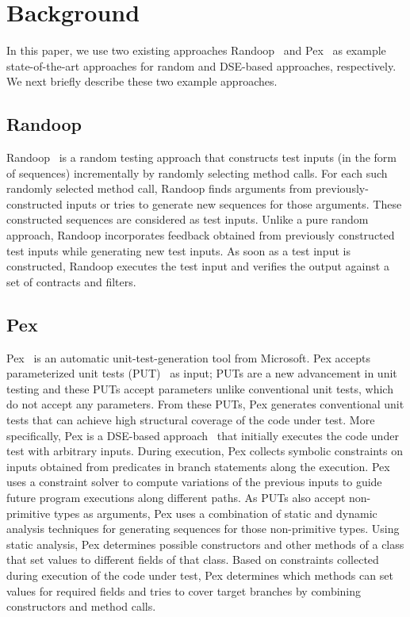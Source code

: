 \section{Background}
\label{sec:background}

In this paper, we use two existing approaches Randoop~\cite{pacheco:feedback} and Pex~\cite{tillman:pexwhite} as example state-of-the-art approaches for random and DSE-based approaches, respectively. We next briefly describe these two example approaches.

\subsection{Randoop}

Randoop~\cite{pacheco:feedback} is a random testing approach that constructs test inputs (in the form of sequences) incrementally by randomly selecting method calls. For each such randomly selected method call, Randoop finds arguments from previously-constructed inputs or tries to generate new sequences for those arguments. These constructed sequences are considered as test inputs. Unlike a pure random approach, Randoop incorporates feedback obtained from previously constructed test inputs while generating new test inputs. As soon as a test input is constructed, Randoop executes the test input and verifies the output against a set of contracts and filters. 

\subsection{Pex}
\label{sec:pex}

Pex~\cite{tillman:pexwhite} is an automatic unit-test-generation tool from Microsoft. Pex accepts parameterized unit tests (PUT)~\cite{tillmann05:parameterized} as input; PUTs are a new advancement in unit testing and these PUTs accept parameters unlike conventional unit tests, which do not accept any parameters. From these PUTs, Pex generates conventional unit tests that can achieve high structural coverage of the code under test. More specifically, Pex is a DSE-based approach~\cite{godefroid:dart} that initially executes the code under test with arbitrary inputs. During execution, Pex collects symbolic constraints on inputs obtained from predicates in branch statements along the execution. Pex uses a constraint solver to compute variations of the previous inputs to guide future program executions along different paths. As PUTs also accept non-primitive types as arguments, Pex uses a combination of static and dynamic analysis techniques for generating sequences for those non-primitive types. Using static analysis, Pex determines possible constructors and other methods of a class that set values to different fields of that class. Based on constraints collected during execution of the code under test, Pex determines which methods can set values for required fields and tries to cover target branches by combining constructors and method calls.